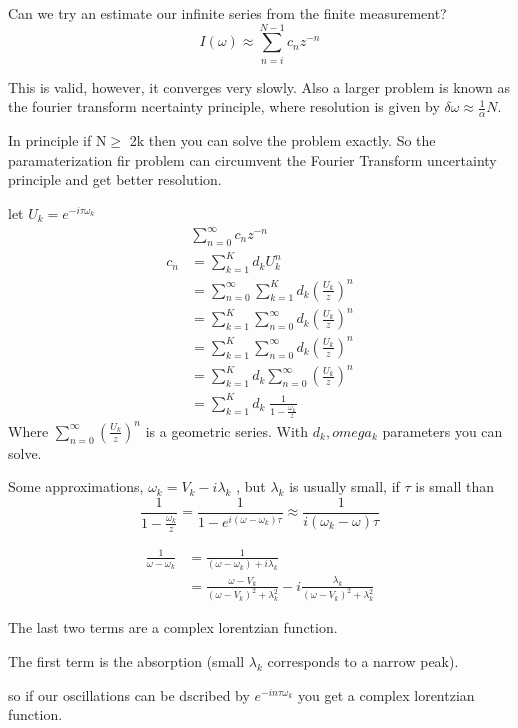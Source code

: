 \documentclass{article}
\newcommand{\be}{\begin{equation}}
\newcommand{\ee}{\end{equation}}
\begin{document}
Can we try an estimate our infinite series from the finite measurement?
\be
I(\omega) \approx \sum_{n=i}^{N-1} c_n z^{-n}
\ee

This is valid, however, it converges very slowly.
Also a larger problem is known as the fourier transform ncertainty principle, where resolution is given by $\delta \omega \approx \frac{1}{\alpha} N$.

In principle if N$\geq$ 2k then you can solve the problem exactly.
So the paramaterization fir problem can circumvent the Fourier Transform uncertainty principle and get better resolution.

let $U_k = e^{-i\tau\omega_k}$
\be
\begin{split}
    &\sum_{n=0}^\infty c_nz^{-n}\\
    c_n &= \sum_{k=1}^K d_k U_k^n\\
    &= \sum_{n=0}^\infty \sum_{k=1}^K d_k\left(\frac{U_k}{z}\right)^n\\
    &= \sum_{k=1}^K \sum_{n=0}^\infty d_k\left(\frac{U_k}{z}\right)^n\\
    &= \sum_{k=1}^K \sum_{n=0}^\infty d_k\left(\frac{U_k}{z}\right)^n\\
    &= \sum_{k=1}^K d_k \sum_{n=0}^\infty \left(\frac{U_k}{z}\right)^n\\
    &= \sum_{k=1}^K d_k \; \frac{1}{1 - \frac{\omega_k}{z}}
\end{split}
\ee
Where $\sum_{n=0}^\infty \left(\frac{U_k}{z}\right)^n$ is a geometric series.
With $d_k,omega_k$ parameters you can solve.

Some approximations, $\omega_k = V_k - i\lambda_k$ , but $\lambda_k$ is usually small, if $\tau$ is small than
\be
\frac{1}{1-\frac{\omega_k}{z}} = \frac{1}{1-e^{i(\omega-\omega_k)\tau}} \approx \frac{1}{i(\omega_k-\omega)\tau}
\ee

\be
\begin{split}
    \frac{1}{\omega-\omega_k} &= \frac{1}{(\omega-\omega_k)+i\lambda_k} \\
    &= \frac{\omega-V_k}{(\omega-V_k)^2 + \lambda_k^2} - i \frac{\lambda_k}{(\omega-V_k)^2+\lambda_k^2}
\end{split}
\ee

The last two terms are a complex lorentzian function.

The first term is the absorption (small $\lambda_k$ corresponds to a narrow peak).

so if our oscillations can be dscribed by $e^{-in\tau\omega_k}$ you get a complex lorentzian function.
\end{document}
